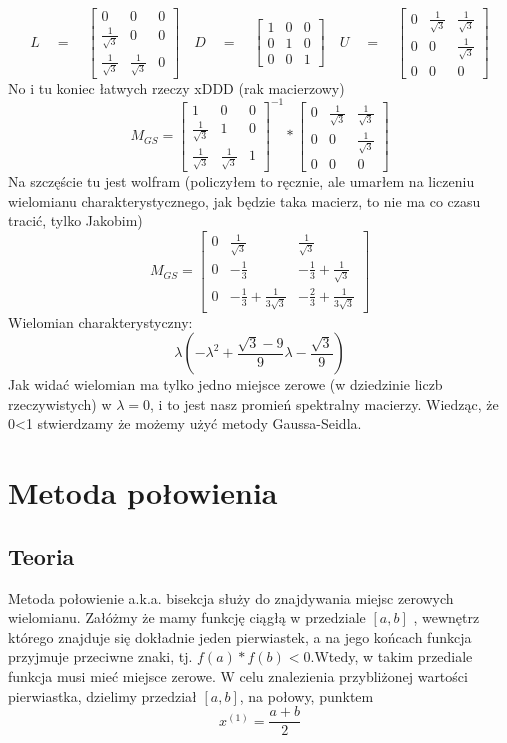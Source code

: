 \documentclass[a4paper]{article}
\begin{document}
$$L \quad = \quad 
\begin{bmatrix}
0 & 0 &  0 \\
 \frac{1}{\sqrt{3}} & 0 &  0 \\
 \frac{1}{\sqrt{3}} &  \frac{1}{\sqrt{3}} & 0
\end{bmatrix}
\quad
D \quad = \quad 
\begin{bmatrix}
1 & 0 &  0 \\
 0 & 1 &  0 \\
 0 &  0 & 1
\end{bmatrix}
\quad
U \quad = \quad 
\begin{bmatrix}
0 & \frac{1}{\sqrt{3}} &  \frac{1}{\sqrt{3}} \\
0 & 0 &  \frac{1}{\sqrt{3}} \\
 0 &  0 & 0
\end{bmatrix}
$$
No i tu koniec łatwych rzeczy xDDD (rak macierzowy)
$$M_{GS} = 
\begin{bmatrix}
1 & 0 &  0 \\
 \frac{1}{\sqrt{3}} & 1 &  0 \\
 \frac{1}{\sqrt{3}} &  \frac{1}{\sqrt{3}} & 1
\end{bmatrix}^{-1} * 
\begin{bmatrix}
0 & \frac{1}{\sqrt{3}} &  \frac{1}{\sqrt{3}} \\
0 & 0 &  \frac{1}{\sqrt{3}} \\
 0 &  0 & 0
\end{bmatrix}
$$
Na szczęście tu jest wolfram (policzyłem to ręcznie, ale umarłem na liczeniu wielomianu charakterystycznego, jak będzie taka macierz, to nie ma co czasu tracić, tylko Jakobim)
$$
M_{GS} = 
\begin{bmatrix}
0 & \frac{1}{\sqrt{3}} &  \frac{1}{\sqrt{3}} \\
 0 & -\frac{1}{3} & -\frac{1}{3}+\frac{1}{\sqrt{3}} \\
 0 &  -\frac{1}{3} + \frac{1}{3\sqrt{3}} & -\frac{2}{3} + \frac{1}{3\sqrt{3}}
\end{bmatrix}
$$
Wielomian charakterystyczny:
$$ \lambda(-\lambda^2 +\frac{\sqrt{3}-9}{9} \lambda - \frac{\sqrt{3}}{9}) $$
Jak widać wielomian ma tylko jedno miejsce zerowe (w dziedzinie liczb rzeczywistych) w $\lambda = 0$, i to jest nasz promień spektralny macierzy. Wiedząc, że 0<1 stwierdzamy że możemy użyć metody Gaussa-Seidla.
\section{Metoda połowienia}
\subsection{Teoria}
Metoda połowienie a.k.a. bisekcja służy do znajdywania miejsc zerowych wielomianu.
\newline
Załóżmy że mamy funkcję ciągłą w przedziale $[a,b]$ , wewnętrz którego znajduje się dokładnie jeden pierwiastek, a na jego końcach funkcja przyjmuje przeciwne znaki, tj. $f(a)*f(b)<0$.Wtedy, w takim przediale funkcja musi mieć miejsce zerowe.
W celu znalezienia przybliżonej wartości pierwiastka, dzielimy przedział $[a,b]$, na połowy, punktem 
$$ x^{(1)} = \frac{a+b}{2} $$
\end{document}
